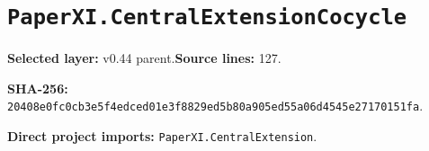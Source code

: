 \documentclass[10pt,oneside]{book}
\begin{document}
\section{\texorpdfstring{\nolinkurl{PaperXI.CentralExtensionCocycle}}{PaperXI.CentralExtensionCocycle}}\label{module:PaperXI.CentralExtensionCocycle}

\textbf{Selected layer:} v0.44 parent.\quad\textbf{Source lines:} 127.\par\textbf{SHA-256:} {\scriptsize\nolinkurl{20408e0fc0cb3e5f4edced01e3f8829ed5b80a905ed55a06d4545e27170151fa}}.


\textbf{Direct project imports:} \nolinkurl{PaperXI.CentralExtension}.
\end{document}
